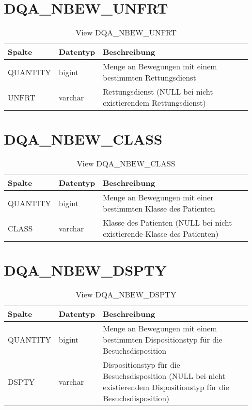 \section{DQA\_NBEW\_UNFRT}

\begin{table}[ht]
	\centering
	\caption{View DQA\_NBEW\_UNFRT}
	\label{tab:dqanbewunfrt}
	\begin{tabular}{||l|l|p{10cm}||}
		\hline
		Spalte & Datentyp & Beschreibung \\ [0.5ex] \hline \hline
		QUANTITY & bigint & Menge an Bewegungen mit einem bestimmten Rettungsdienst \\ \hline
		UNFRT & varchar & Rettungsdienst (NULL bei nicht existierendem Rettungsdienst)\\ \hline
	\end{tabular}
\end{table}
 \clearpage
  \section{DQA\_NBEW\_CLASS}

  \begin{table}[ht]
    \centering
    \caption{View DQA\_NBEW\_CLASS}
    \label{tab:dqanbewclass}
    \begin{tabular}{||l|l|p{10cm}||}
      \hline
      Spalte & Datentyp & Beschreibung \\ [0.5ex] \hline \hline
QUANTITY & bigint & Menge an Bewegungen mit einer bestimmten Klasse des Patienten \\ \hline
CLASS & varchar & Klasse des Patienten (NULL bei nicht existierende Klasse des Patienten)\\ \hline
    \end{tabular}
  \end{table}
 
  \section{DQA\_NBEW\_DSPTY}

  \begin{table}[ht]
    \centering
    \caption{View DQA\_NBEW\_DSPTY}
    \label{tab:dqanbewdspty}
    \begin{tabular}{||l|l|p{10cm}||}
      \hline
      Spalte & Datentyp & Beschreibung \\ [0.5ex] \hline \hline
QUANTITY & bigint & Menge an Bewegungen mit einem bestimmten Dispositionstyp für die Besuchsdisposition \\ \hline
DSPTY & varchar & Dispositionstyp für die Besuchsdisposition (NULL bei nicht existierendem Dispositionstyp für die Besuchsdisposition)\\ \hline
    \end{tabular}
  \end{table}
